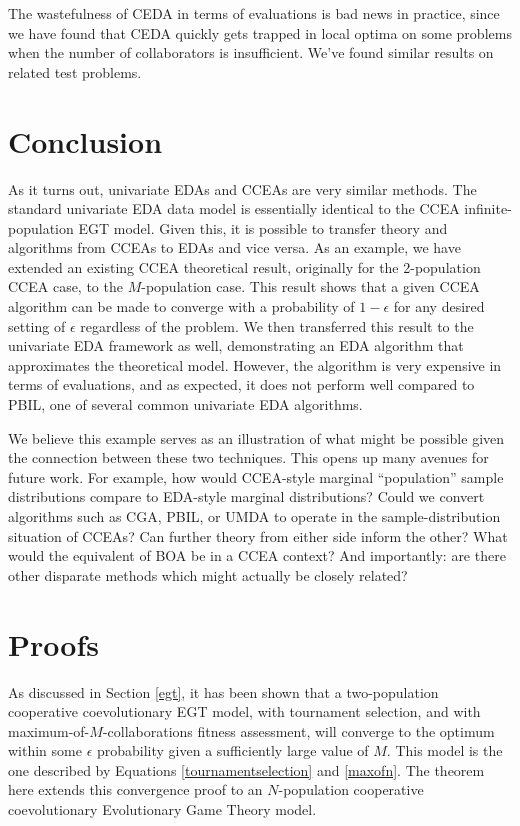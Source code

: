 \documentclass{sig-alt-full}
\begin{document}
The wastefulness of CEDA in terms of evaluations is bad news in practice, since we have found that CEDA quickly gets trapped in local optima on some problems when the number of collaborators is insufficient.  We've found similar results on related test problems.

\section{Conclusion}

As it turns out, univariate EDAs and CCEAs are very similar methods.  The standard univariate EDA data model is essentially identical to the CCEA infinite-population EGT model.  Given this, it is possible to transfer theory and algorithms from CCEAs to EDAs and vice versa.  As an example, we have extended an existing CCEA theoretical result, originally for the 2-population CCEA case, to the \(M\)-population case.  This result shows that a given CCEA algorithm can be made to converge with a probability of \(1-\epsilon\) for any desired setting of \(\epsilon\) regardless of the problem.  We then transferred this result to the univariate EDA framework as well, demonstrating an EDA algorithm that approximates the theoretical model.  However, the algorithm is very expensive in terms of evaluations, and as expected, it does not perform well compared to PBIL, one of several common univariate EDA algorithms.

We believe this example serves as an illustration of what might be possible given the connection between these two techniques.  This opens up many avenues for future work.  For example, how would CCEA-style marginal ``population'' sample distributions compare to EDA-style marginal distributions?  Could we convert algorithms such as CGA, PBIL, or UMDA to operate in the sample-distribution situation of CCEAs?  Can further theory from either side inform the other?  What would the equivalent of BOA be in a CCEA context?  And importantly: are there other disparate methods which might actually be closely related?

\section{Proofs}
\label{proofs}

As discussed in Section \ref{egt}, it has been shown that a two-population cooperative coevolutionary EGT model, with tournament selection, and with maximum-of-\(M\)-collaborations fitness assessment, will converge to the optimum within some \(\epsilon\) probability given a sufficiently large value of \(M\).  This model is the one described by Equations  \ref{tournamentselection} and \ref{maxofn}.  The theorem here extends this convergence proof to an \(N\)-population cooperative coevolutionary Evolutionary Game Theory model.
\end{document}
